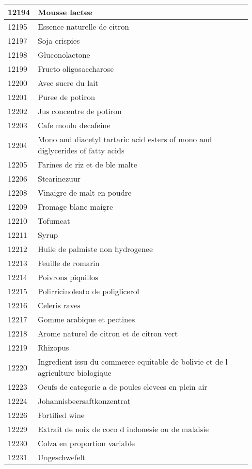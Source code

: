\begin{longtable}{|l|l|}
12194 & Mousse lactee \\ \hline 
12195 & Essence naturelle de citron \\ \hline 
12197 & Soja crispies \\ \hline 
12198 & Gluconolactone \\ \hline 
12199 & Fructo oligosaccharose \\ \hline 
12200 & Avec sucre du lait \\ \hline 
12201 & Puree de potiron \\ \hline 
12202 & Jus concentre de potiron \\ \hline 
12203 & Cafe moulu decafeine \\ \hline 
12204 & Mono and diacetyl tartaric acid esters of mono and diglycerides of fatty acids \\ \hline 
12205 & Farines de riz et de ble malte \\ \hline 
12206 & Stearinezuur \\ \hline 
12208 & Vinaigre de malt en poudre \\ \hline 
12209 & Fromage blanc maigre \\ \hline 
12210 & Tofumeat \\ \hline 
12211 & Syrup \\ \hline 
12212 & Huile de palmiste non hydrogenee \\ \hline 
12213 & Feuille de romarin \\ \hline 
12214 & Poivrons piquillos \\ \hline 
12215 & Polirricinoleato de poliglicerol \\ \hline 
12216 & Celeris raves \\ \hline 
12217 & Gomme arabique et pectines \\ \hline 
12218 & Arome naturel de citron et de citron vert \\ \hline 
12219 & Rhizopus \\ \hline 
12220 & Ingredient issu du commerce equitable de bolivie et de l agriculture biologique \\ \hline 
12223 & Oeufs de categorie a de poules elevees en plein air \\ \hline 
12224 & Johannisbeersaftkonzentrat \\ \hline 
12226 & Fortified wine \\ \hline 
12229 & Extrait de noix de coco d indonesie ou de malaisie \\ \hline 
12230 & Colza en proportion variable \\ \hline 
12231 & Ungeschwefelt \\ \hline 

\end{longtable}
